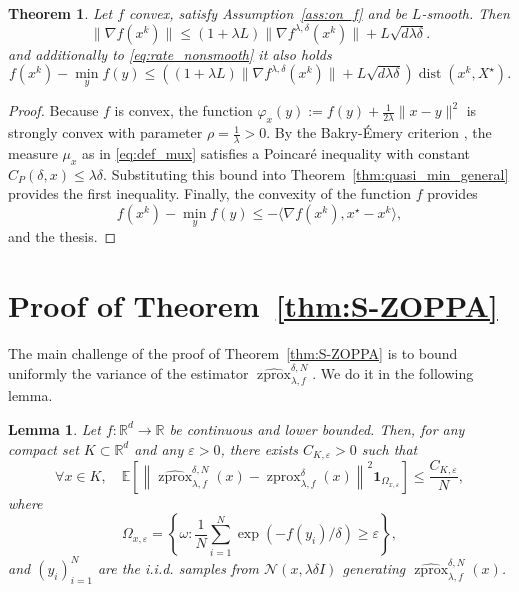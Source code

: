 \documentclass{article}
\newtheorem{theorem}{Theorem}
\newtheorem{lemma}{Lemma}
\newcommand{\R}{\mathbb{R}}
\newcommand{\zprox}{\ensuremath{\operatorname{zprox}}}
\newcommand{\szprox}{\ensuremath{\widehat{\operatorname{zprox}}}}
\newcommand{\dist}{\ensuremath{\operatorname{dist}}}
\begin{document}
\begin{theorem}\label{thm:quasi_min_cvx}
Let $f$ convex, satisfy Assumption~\ref{ass:on_f} and be $L$-smooth. Then
    \[\|\nabla f(x^k)\| \leq (1+\lambda L) \|\nabla f^{\lambda, \delta}(x^k)\|+ L \sqrt{d \lambda \delta}.\]
    and additionally to \eqref{eq:rate_nonsmooth} it also holds
    \[f(x^k) - \min_y f(y) \leq \left((1+\lambda L) \|\nabla f^{\lambda, \delta}(x^k)\|+ L \sqrt{d \lambda \delta}\right)\dist(x^k,X^\star).\]
\end{theorem}

\begin{proof}
Because $f$ is convex, the function $\varphi_x(y) := f(y) + \frac{1}{2\lambda}\|x-y\|^2$ is strongly convex with parameter $\rho = \frac{1}{\lambda}> 0$. By the Bakry-Émery criterion \cite[Proposition 4.8.1 and Corollary 4.8.2]{bakry2014analysis}, the measure $\mu_x$ as in \eqref{eq:def_mux} satisfies a Poincaré inequality with constant $C_P(\delta, x) \leq \lambda\delta$. Substituting this bound into Theorem~\ref{thm:quasi_min_general} provides the first inequality. Finally, the convexity of the function $f$ provides
\[f(x^k) - \min_y f(y) \leq -\langle \nabla f(x^k) , x^\star - x^k\rangle,\]
and the thesis.
\end{proof}

\section{Proof of Theorem~\ref{thm:S-ZOPPA}}\label{app:proof_S-ZOPPA}

The main challenge of the proof of Theorem~\ref{thm:S-ZOPPA} is to bound uniformly the variance of the estimator \(\szprox^{\delta,N}_{\lambda, f}\). We do it in the following lemma.

\begin{lemma}\label{lem:boundedness}
    Let \(f:\mathbb{R}^d\to \R\) be continuous and lower bounded. Then, for any compact set \(K\subset\R^d\) and any \(\varepsilon>0\), there exists \(C_{K,\varepsilon}>0\) such that
    \[
    \forall x\in K,\quad
    \mathbb{E}\left[
    \left\|
    \szprox^{\delta,N}_{\lambda, f}(x)
    -
    \zprox^{\delta}_{\lambda, f}(x)
    \right\|^2
    \mathbf{1}_{\Omega_{x,\varepsilon}}
    \right]
    \le
    \frac{C_{K,\varepsilon}}{N},
    \]
    where
    \[
    \Omega_{x,\varepsilon}
    =
    \left\{
    \omega:
    \frac{1}{N}\sum_{i=1}^N\exp(-f(y_i)/\delta)\ge\varepsilon
    \right\},
    \]
    and \(\left(y_i\right)_{i=1}^N\) are the i.i.d. samples from
    \(\mathcal{N}(x,\lambda\delta I)\) generating
    \(\szprox^{\delta,N}_{\lambda, f}(x)\).
\end{lemma}
\end{document}
